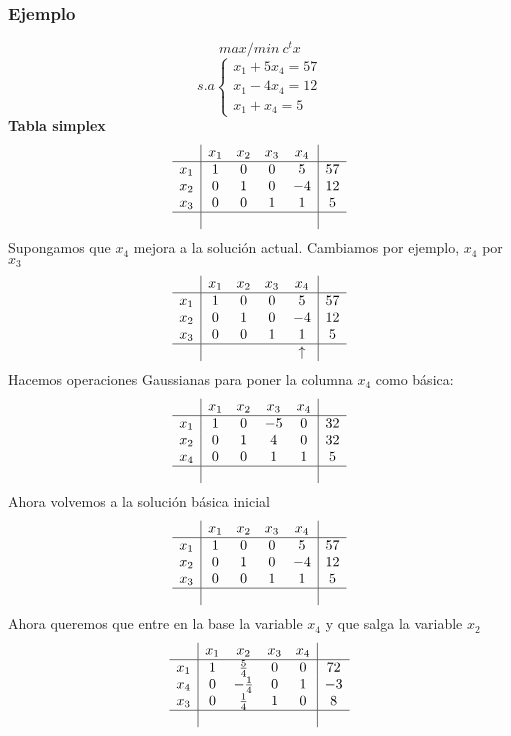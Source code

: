 \documentclass[11pt,fleqn]{book} %
\begin{document}
\subsubsection{Ejemplo}
$$ max/min ~c^t x$$
$$s.a \left\{ \begin{array}{c}
x_1+5x_4=57 \\
x_1-4 x_4=12 \\
x_1+x_4 = 5
\end{array}\right.$$
\textbf{Tabla simplex}
$$
\begin{array}{c|cccc|c}
 & x_1 & x_2 & x_3 & x_4 &  \\ \hline
x_1 & 1 & 0 & 0 & 5 & 57 \\
x_2 & 0 & 1 & 0 & -4 & 12 \\
x_3 & 0 & 0 & 1 & 1 & 5 \\ \hline
& & & & &
\end{array}
$$
Supongamos que $x_4$ mejora a la solución actual. Cambiamos por ejemplo, $x_4$ por $x_3$
$$
\begin{array}{c|cccc|c}
& x_1 & x_2 & x_3 & x_4 &  \\ \hline
x_1 & 1 & 0 & 0 & 5 & 57 \\
x_2 & 0 & 1 & 0 & -4 & 12 \\
x_3 & 0 & 0 & 1 & 1 & 5 \\ \hline
& & & & \uparrow &
\end{array}
$$
Hacemos operaciones Gaussianas para poner la columna $x_4$ como básica:
$$
\begin{array}{c|cccc|c}
& x_1 & x_2 & x_3 & x_4 &  \\ \hline
x_1 & 1 & 0 & -5 & 0 & 32 \\
x_2 & 0 & 1 & 4 & 0 & 32 \\
x_4 & 0 & 0 & 1 & 1 & 5 \\ \hline
& & & &  &
\end{array}
$$
Ahora volvemos a la solución básica inicial
$$
\begin{array}{c|cccc|c}
& x_1 & x_2 & x_3 & x_4 &  \\ \hline
x_1 & 1 & 0 & 0 & 5 & 57 \\
x_2 & 0 & 1 & 0 & -4 & 12 \\
x_3 & 0 & 0 & 1 & 1 & 5 \\ \hline
& & & & &
\end{array}
$$
Ahora queremos que entre en la base la variable $x_4$ y que salga la variable $x_2$
$$
\begin{array}{c|cccc|c}
& x_1 & x_2 & x_3 & x_4 &  \\ \hline
x_1 & 1 & \frac{5}{4} & 0 & 0 & 72 \\
x_4 & 0 & -\frac{1}{4} & 0 & 1 & -3 \\
x_3 & 0 & \frac{1}{4} & 1 & 0 & 8 \\ \hline
& & & & &
\end{array}
$$
\end{document}
